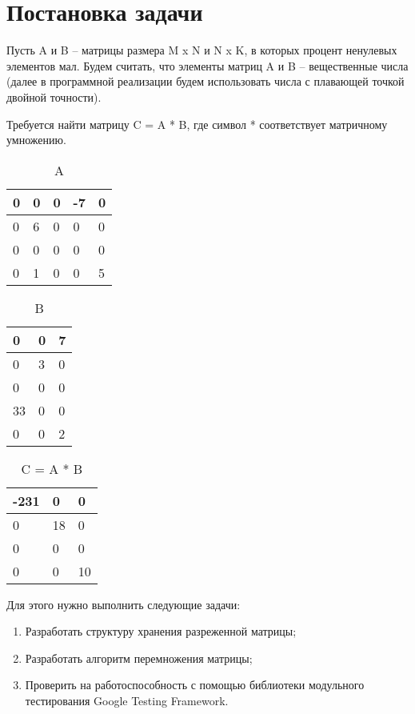 \documentclass{report}
\begin{document}
\section*{Постановка задачи}
\par Пусть A и B –  матрицы размера M x N и N x K, в которых процент ненулевых элементов мал. Будем считать, что элементы матриц A и B – вещественные числа (далее в программной реализации будем использовать числа с плавающей точкой двойной точности).

\par Требуется найти матрицу C = A * B, где символ * соответствует матричному умножению.


\begin{table}[!h]
\caption{A}
\begin{tabular}{ | l | l | l | l | l | }
\hline
0 & 0 & 0 & -7 & 0 \\ \hline
0 & 6 & 0 & 0 & 0 \\ \hline
0 & 0 & 0 & 0 & 0 \\ \hline
0 & 1 & 0 & 0 & 5 \\
\hline
\end{tabular}
\end{table}

\begin{table}[!h]
 \caption{B}
\begin{tabular}{ | l | l | l | }
\hline
0 & 0 & 7 \\ \hline
0 & 3 & 0 \\ \hline
0 & 0 & 0 \\ \hline
33 & 0 & 0 \\ \hline
0 & 0 & 2 \\
\hline
\end{tabular}
\end{table}

\begin{table}[!h]
  \caption{C = A * B}
\begin{tabular}{ | l | l | l | }
\hline
-231 & 0 & 0 \\ \hline
0 & 18 & 0 \\ \hline
0 & 0 & 0 \\ \hline
0 & 0 & 10 \\
\hline
\end{tabular}
\end{table}


\par Для этого нужно выполнить следующие задачи:
\begin{enumerate}
\item Разработать структуру хранения разреженной матрицы;
\item Разработать алгоритм перемножения матрицы;
\item Проверить на работоспособность с помощью библиотеки модульного тестирования Google Testing Framework.
\end{enumerate}
\newpage
\end{document}

